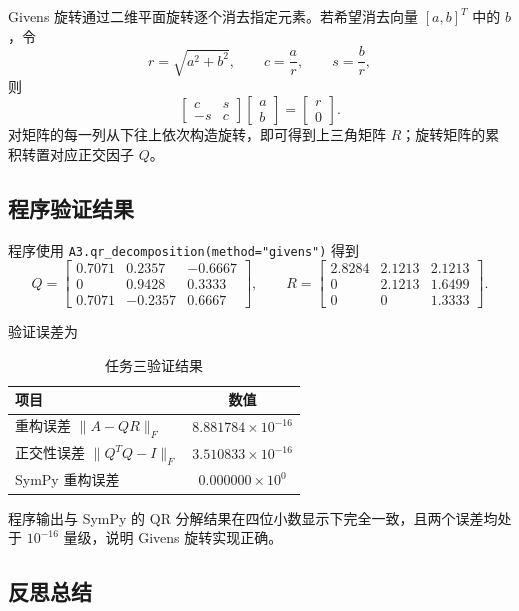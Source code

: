 \documentclass[UTF8,zihao=-4]{ctexart}
\begin{document}
Givens 旋转通过二维平面旋转逐个消去指定元素。若希望消去向量 $[a,b]^T$ 中的 $b$，令
\[
    r=\sqrt{a^2+b^2},\qquad c=\frac{a}{r},\qquad s=\frac{b}{r},
\]
则
\[
\begin{bmatrix}
c&s\\
-s&c
\end{bmatrix}
\begin{bmatrix}
a\\b
\end{bmatrix}
=
\begin{bmatrix}
r\\0
\end{bmatrix}.
\]
对矩阵的每一列从下往上依次构造旋转，即可得到上三角矩阵 $R$；旋转矩阵的累积转置对应正交因子 $Q$。

\subsection{程序验证结果}

程序使用 \texttt{A3.qr\_decomposition(method="givens")} 得到
\[
Q=\begin{bmatrix}
0.7071&0.2357&-0.6667\\
0&0.9428&0.3333\\
0.7071&-0.2357&0.6667
\end{bmatrix},
\qquad
R=\begin{bmatrix}
2.8284&2.1213&2.1213\\
0&2.1213&1.6499\\
0&0&1.3333
\end{bmatrix}.
\]

验证误差为
\begin{table}[H]
\centering
\caption{任务三验证结果}
\begin{tabular}{lc}
\toprule
项目 & 数值 \\
\midrule
重构误差 $\|A-QR\|_F$ & $8.881784\times 10^{-16}$ \\
正交性误差 $\|Q^TQ-I\|_F$ & $3.510833\times 10^{-16}$ \\
SymPy 重构误差 & $0.000000\times 10^{0}$ \\
\bottomrule
\end{tabular}
\end{table}

程序输出与 SymPy 的 QR 分解结果在四位小数显示下完全一致，且两个误差均处于 $10^{-16}$ 量级，说明 Givens 旋转实现正确。

\subsection{反思总结}
\end{document}
